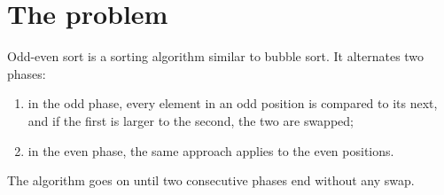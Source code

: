 \section{The problem}
Odd-even sort is a sorting algorithm similar to bubble sort. It alternates two phases:
\begin{enumerate}
    \item in the odd phase, every element in an odd position is compared to its next, and if the first is larger to the second, the two are swapped;
    \item in the even phase, the same approach applies to the even positions.
\end{enumerate}
The algorithm goes on until two consecutive phases end without any swap.
\bigbreak
